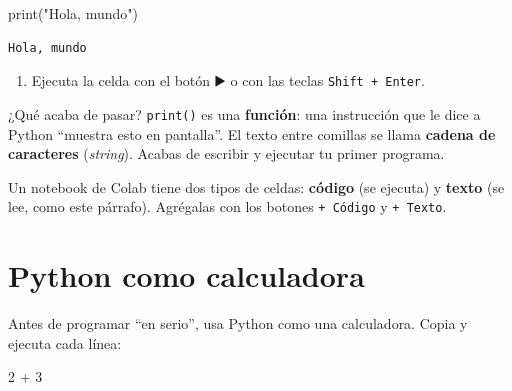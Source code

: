 \documentclass[
  spanish,
  letterpaper,
  DIV=11,
  numbers=noendperiod]{scrreprt}
\newenvironment{Shaded}{\begin{snugshade}}{\end{snugshade}}
\newcommand{\BuiltInTok}[1]{\textcolor[rgb]{0.00,0.23,0.31}{#1}}
\newcommand{\DecValTok}[1]{\textcolor[rgb]{0.68,0.00,0.00}{#1}}
\newcommand{\NormalTok}[1]{\textcolor[rgb]{0.00,0.23,0.31}{#1}}
\newcommand{\OperatorTok}[1]{\textcolor[rgb]{0.37,0.37,0.37}{#1}}
\newcommand{\StringTok}[1]{\textcolor[rgb]{0.13,0.47,0.30}{#1}}
\providecommand{\tightlist}{%
  \setlength{\itemsep}{0pt}\setlength{\parskip}{0pt}}
\begin{document}
\begin{Shaded}
\begin{Highlighting}[]
\BuiltInTok{print}\NormalTok{(}\StringTok{"Hola, mundo"}\NormalTok{)}
\end{Highlighting}
\end{Shaded}

\begin{verbatim}
Hola, mundo
\end{verbatim}

\begin{enumerate}
\def\labelenumi{\arabic{enumi}.}
\setcounter{enumi}{3}
\tightlist
\item
  Ejecuta la celda con el botón ▶️ o con las teclas
  \texttt{Shift\ +\ Enter}.
\end{enumerate}

¿Qué acaba de pasar? \texttt{print()} es una \textbf{función}: una
instrucción que le dice a Python ``muestra esto en pantalla''. El texto
entre comillas se llama \textbf{cadena de caracteres} (\emph{string}).
Acabas de escribir y ejecutar tu primer programa.

\begin{tcolorbox}[enhanced jigsaw, arc=.35mm, bottomrule=.15mm, bottomtitle=1mm, breakable, colback=white, colbacktitle=quarto-callout-note-color!10!white, colframe=quarto-callout-note-color-frame, coltitle=black, left=2mm, leftrule=.75mm, opacityback=0, opacitybacktitle=0.6, rightrule=.15mm, title=\textcolor{quarto-callout-note-color}{\faInfo}\hspace{0.5em}{Nota}, titlerule=0mm, toprule=.15mm, toptitle=1mm]

Un notebook de Colab tiene dos tipos de celdas: \textbf{código} (se
ejecuta) y \textbf{texto} (se lee, como este párrafo). Agrégalas con los
botones \texttt{+\ Código} y \texttt{+\ Texto}.

\end{tcolorbox}

\section{Python como calculadora}\label{python-como-calculadora}

Antes de programar ``en serio'', usa Python como una calculadora. Copia
y ejecuta cada línea:

\begin{Shaded}
\begin{Highlighting}[]
\DecValTok{2} \OperatorTok{+} \DecValTok{3}
\end{Highlighting}
\end{Shaded}
\end{document}
